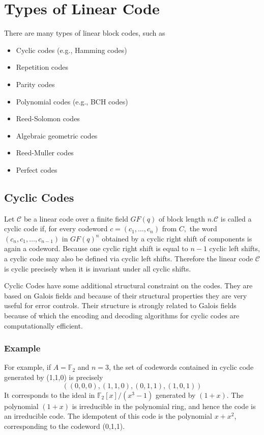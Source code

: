\documentclass[11pt, a4paper]{article}
\begin{document}
\section{Types of Linear Code }
There are many types of linear block codes, such as
\begin{itemize}
\item Cyclic codes (e.g., Hamming codes)
\item Repetition codes
\item Parity codes
\item Polynomial codes (e.g., BCH codes)
\item Reed-Solomon codes
\item Algebraic geometric codes
\item Reed-Muller codes
\item Perfect codes

\end{itemize}

\subsection{Cyclic Codes }
Let $\mathcal{C}$ be a linear code over a finite field  $G F(q)$ of block length $n . \mathcal{C}$ is called a cyclic code if, for every codeword $c=\left(c_{1}, \ldots, c_{n}\right)$ from $C,$ the word $\left(c_{n}, c_{1}, \ldots, c_{n-1}\right)$ in $G F(q)^{n}$ obtained by a cyclic right shift of components is again a codeword. Because one cyclic right shift is equal to $n-1$ cyclic left shifts, a cyclic code may also be defined via cyclic left shifts. Therefore the linear code $\mathcal{C}$ is cyclic precisely when it is invariant under all cyclic shifts.

Cyclic Codes have some additional structural constraint on the codes. They are based on Galois fields and because of their structural properties they are very useful for error controls. Their structure is strongly related to Galois fields because of which the encoding and
decoding algorithms for cyclic codes are computationally efficient.

\subsubsection{Example}
For example, if $A=\mathbb{F}_{2}$ and $n=3$, the set of codewords contained in cyclic code generated by (1,1,0) is precisely
$$
((0,0,0),(1,1,0),(0,1,1),(1,0,1))
$$
It corresponds to the ideal in $\mathbb{F}_{2}[x] /\left(x^{3}-1\right)$ generated by $(1+x)$.
The polynomial $(1+x)$ is irreducible in the polynomial ring, and hence the code is an irreducible code.
The idempotent of this code is the polynomial $x+x^{2}$, corresponding to the codeword (0,1,1).
\end{document}

